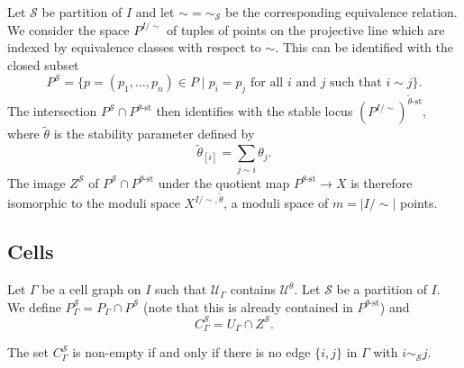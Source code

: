 \documentclass[11pt, a4paper]{amsart}
\begin{document}
Let \(\mathcal{S}\) be partition of \(I\) and let \({\sim} = {\sim}_\mathcal{S}\) be the corresponding equivalence relation. 
We consider the space \(P^{I/\sim}\) of tuples of points on the projective line which are indexed by equivalence classes with respect to \(\sim\). 
This can be identified with the closed subset 
\[
	P^\mathcal{S} = \{ p = (p_1,\ldots,p_n) \in P \mid p_i = p_j \text{ for all \(i\) and \(j\) such that } i \sim j \}. 
\]
The intersection \(P^\mathcal{S} \cap P^{\theta\text{-st}}\) then identifies with the stable locus \({(P^{I/\sim})}^{\tilde{\theta}\text{-st}}\), where \(\tilde{\theta}\) is the stability parameter defined by
\[
	\tilde{\theta}_{[i]} = \sum_{j \sim i} \theta_j.
\]
The image \(Z^\mathcal{S}\) of \(P^\mathcal{S} \cap P^{\theta\text{-st}}\) under the quotient map \(P^{\theta\text{-st}} \to X\) is therefore isomorphic to the moduli space \(X^{I/\sim,\tilde{\theta}}\), a moduli space of \(m = \left|I/\sim\right|\) points.

\subsection*{Cells}

Let \(\Gamma\) be a cell graph on \(I\) such that \(\mathcal{U}_\Gamma\) contains \(\mathcal{U}^\theta\). Let \(\mathcal{S}\) be a partition of \(I\). We define \(P_{\Gamma}^\mathcal{S} = P_{\Gamma} \cap P^\mathcal{S}\) (note that this is already contained in \(P^{\theta\text{-st}}\)) and 
\[
	C_\Gamma^\mathcal{S} = U_\Gamma \cap Z^\mathcal{S}.
\]

\begin{lem}
	The set $C_\Gamma^\mathcal{S}$ is non-empty if and only if there is no edge \(\{i,j\}\) in \(\Gamma\) with \(i \sim_\mathcal{S} j\).
\end{lem}
\end{document}
